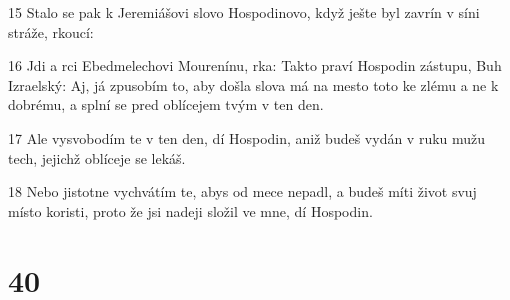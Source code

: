\par 15 Stalo se pak k Jeremiášovi slovo Hospodinovo, když ješte byl zavrín v síni stráže, rkoucí:
\par 16 Jdi a rci Ebedmelechovi Mourenínu, rka: Takto praví Hospodin zástupu, Buh Izraelský: Aj, já zpusobím to, aby došla slova má na mesto toto ke zlému a ne k dobrému, a splní se pred oblícejem tvým v ten den.
\par 17 Ale vysvobodím te v ten den, dí Hospodin, aniž budeš vydán v ruku mužu tech, jejichž oblíceje se lekáš.
\par 18 Nebo jistotne vychvátím te, abys od mece nepadl, a budeš míti život svuj místo koristi, proto že jsi nadeji složil ve mne, dí Hospodin.

\chapter{40}

